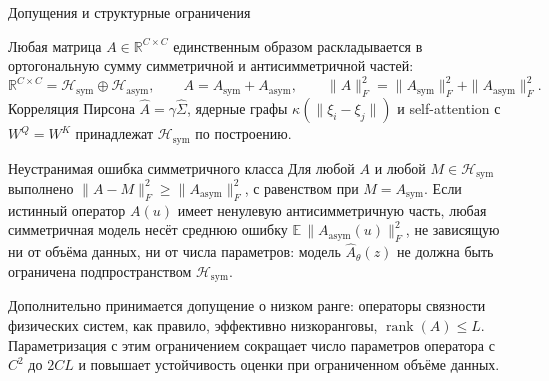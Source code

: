 \documentclass[10pt]{beamer}
\DeclareMathOperator{\rank}{rank}
\newcommand{\R}{\mathbb{R}}
\newcommand{\E}{\mathbb{E}}
\newcommand{\Hsym}{\mathcal{H}_{\mathrm{sym}}}
\newcommand{\Hasym}{\mathcal{H}_{\mathrm{asym}}}
\begin{document}
\begin{frame}{Допущения и структурные ограничения}
\footnotesize

Любая матрица $A \in \R^{C \times C}$ единственным образом раскладывается в
ортогональную сумму симметричной и антисимметричной частей:
\[
\R^{C \times C} = \Hsym \oplus \Hasym, \qquad
A = A_{\mathrm{sym}} + A_{\mathrm{asym}}, \qquad
\|A\|_F^2 = \|A_{\mathrm{sym}}\|_F^2 + \|A_{\mathrm{asym}}\|_F^2.
\]
Корреляция Пирсона $\hat A = \gamma \widehat\Sigma$, ядерные графы
$\kappa(\|\xi_i-\xi_j\|)$ и self-attention с $W^Q=W^K$ принадлежат $\Hsym$ по
построению.

\begin{block}{Неустранимая ошибка симметричного класса}
Для любой $A$ и любой $M \in \Hsym$ выполнено $\|A-M\|_F^2 \ge
\|A_{\mathrm{asym}}\|_F^2$, с равенством при $M=A_{\mathrm{sym}}$. Если
истинный оператор $A(u)$ имеет ненулевую антисимметричную часть, любая
симметричная модель несёт среднюю ошибку $\E\,\|A_{\mathrm{asym}}(u)\|_F^2$,
не зависящую ни от объёма данных, ни от числа параметров: модель
$\hat A_\theta(z)$ не должна быть ограничена подпространством $\Hsym$.
\end{block}

Дополнительно принимается допущение о низком ранге: операторы связности
физических систем, как правило, эффективно низкоранговы, $\rank(A) \le L$.
Параметризация с этим ограничением сокращает число параметров оператора с
$C^2$ до $2CL$ и повышает устойчивость оценки при ограниченном объёме данных.
\end{frame}
\end{document}
